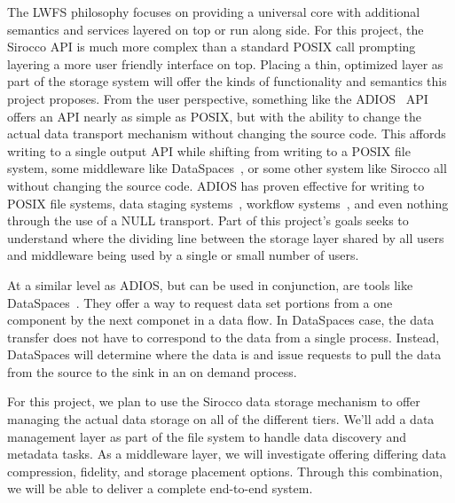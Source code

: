 The LWFS philosophy focuses on providing a universal core with additional
semantics and services layered on top or run along side. For this project, the
Sirocco API is much more complex than a standard POSIX call prompting layering
a more user friendly interface on top. Placing a thin, optimized layer as part
of the storage system will offer the kinds of functionality and semantics this
project proposes. From the user perspective, something like the
ADIOS~\cite{adios} API offers an API nearly as simple as POSIX, but with the
ability to change the actual data transport mechanism without changing the
source code. This affords writing to a single output API while shifting from
writing to a POSIX file system, some middleware like
DataSpaces~\cite{dataspaces}, or some other system like Sirocco all without
changing the source code. ADIOS has proven effective for writing to POSIX file
systems, data staging systems~\cite{predata,dataspaces,nessie}, workflow
systems~\cite{flexpath}, and even nothing through the use of a NULL transport.
Part of this project's goals seeks to understand where the dividing line
between the storage layer shared by all users and middleware being used by a
single or small number of users.

At a similar level as ADIOS, but can be used in conjunction, are tools like
DataSpaces~\cite{dataspaces}. They offer a way to request data set portions
from a one component by the next componet in a data flow. In DataSpaces case,
the data transfer does not have to correspond to the data from a single
process.  Instead, DataSpaces will determine where the data is and issue
requests to pull the data from the source to the sink in an on demand process.

For this project, we plan to use the Sirocco data storage mechanism to
offer managing the actual data storage on all of the different tiers. We'll add
a data management layer as part of the file system to handle data discovery and
metadata tasks. As a middleware layer, we will investigate offering differing
data compression, fidelity, and storage placement options. Through this 
combination, we will be able to deliver a complete end-to-end system.

